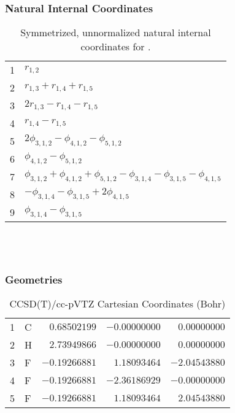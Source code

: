 \documentclass[10pt,oneside]{article}
\begin{document}
\subsubsection*{Natural Internal Coordinates}
\begin{table}[h!]
\centering
\caption{Symmetrized, unnormalized natural internal coordinates for .}
\small
\begin{tabular}{ll}
  1   & $r_{1,2}$ \\
  2   & $r_{1,3} + r_{1,4} + r_{1,5}$ \\
  3   & $2r_{1,3} - r_{1,4} - r_{1,5}$ \\
  4   & $r_{1,4} - r_{1,5}$ \\
  5   & $2\phi_{3,1,2} - \phi_{4,1,2} - \phi_{5,1,2}$ \\
  6   & $\phi_{4,1,2} - \phi_{5,1,2}$ \\
  7   & $\phi_{3,1,2} + \phi_{4,1,2} + \phi_{5,1,2} - \phi_{3,1,4} - \phi_{3,1,5} - \phi_{4,1,5}$ \\
  8   & $-\phi_{3,1,4} - \phi_{3,1,5} + 2\phi_{4,1,5}$ \\
  9   & $\phi_{3,1,4} - \phi_{3,1,5}$ \\
\end{tabular}
\end{table}

\clearpage

\subsection{\ \ \ }

\subsubsection*{Geometries}
\begin{table}[h!]
\centering
\caption{CCSD(T)/cc-pVTZ Cartesian Coordinates (Bohr)}
\begin{tabular}{llrrr}
1  & C  & $ 0.68502199$ & $-0.00000000$ & $ 0.00000000$ \\
2  & H  & $ 2.73949866$ & $-0.00000000$ & $ 0.00000000$ \\
3  & F  & $-0.19266881$ & $ 1.18093464$ & $-2.04543880$ \\
4  & F  & $-0.19266881$ & $-2.36186929$ & $-0.00000000$ \\
5  & F  & $-0.19266881$ & $ 1.18093464$ & $ 2.04543880$ \\
\end{tabular}
\end{table}
\end{document}
